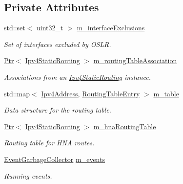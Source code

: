 \subsection*{Private Attributes}
\begin{DoxyCompactItemize}
\item 
std\+::set$<$ uint32\+\_\+t $>$ \hyperlink{classns3_1_1olsr_1_1RoutingProtocol_afa7fdc171732e31fb92298d62f6340e6}{m\+\_\+interface\+Exclusions}
\begin{DoxyCompactList}\small\item\em Set of interfaces excluded by O\+S\+LR. \end{DoxyCompactList}\item 
\hyperlink{classns3_1_1Ptr}{Ptr}$<$ \hyperlink{classns3_1_1Ipv4StaticRouting}{Ipv4\+Static\+Routing} $>$ \hyperlink{classns3_1_1olsr_1_1RoutingProtocol_ae631ae3941f563718274166203d3b178}{m\+\_\+routing\+Table\+Association}
\begin{DoxyCompactList}\small\item\em Associations from an \hyperlink{classns3_1_1Ipv4StaticRouting}{Ipv4\+Static\+Routing} instance. \end{DoxyCompactList}\item 
std\+::map$<$ \hyperlink{classns3_1_1Ipv4Address}{Ipv4\+Address}, \hyperlink{structns3_1_1olsr_1_1RoutingTableEntry}{Routing\+Table\+Entry} $>$ \hyperlink{classns3_1_1olsr_1_1RoutingProtocol_a9703fb92cc9a864c0e2874387ead3aa3}{m\+\_\+table}
\begin{DoxyCompactList}\small\item\em Data structure for the routing table. \end{DoxyCompactList}\item 
\hyperlink{classns3_1_1Ptr}{Ptr}$<$ \hyperlink{classns3_1_1Ipv4StaticRouting}{Ipv4\+Static\+Routing} $>$ \hyperlink{classns3_1_1olsr_1_1RoutingProtocol_a398799911ae136e0b247b4bbd608c336}{m\+\_\+hna\+Routing\+Table}
\begin{DoxyCompactList}\small\item\em Routing table for H\+NA routes. \end{DoxyCompactList}\item 
\hyperlink{classns3_1_1EventGarbageCollector}{Event\+Garbage\+Collector} \hyperlink{classns3_1_1olsr_1_1RoutingProtocol_a80368d3da46150cf3fc9139c40f33d53}{m\+\_\+events}
\begin{DoxyCompactList}\small\item\em Running events. \end{DoxyCompactList}\item 

\end{DoxyCompactItemize}
